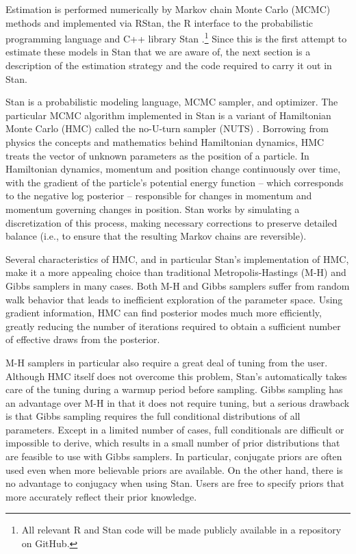 Estimation is performed numerically by Markov chain Monte Carlo (MCMC) methods and implemented via RStan, the R interface to the probabilistic programming language and C++ library Stan .\footnote{All relevant R and Stan code will be made publicly available in a repository on GitHub.} Since this is the first attempt to estimate these models in Stan that we are aware of, the next section is a description of the estimation strategy and the code required to carry it out in Stan.

Stan is a probabilistic modeling language, MCMC sampler, and optimizer. The particular MCMC algorithm implemented in Stan is a variant of Hamiltonian Monte Carlo (HMC) called the no-U-turn sampler (NUTS) . Borrowing from physics the concepts and mathematics behind Hamiltonian dynamics, HMC treats the vector of unknown parameters as the position of a particle. In Hamiltonian dynamics, momentum and position change continuously over time, with the gradient of the particle's potential energy function --  which corresponds to the negative log posterior -- responsible for changes in momentum and momentum governing changes in position. Stan works by simulating a discretization of this process, making necessary corrections to preserve detailed balance (i.e., to ensure that the resulting Markov chains are reversible). 

Several characteristics of HMC, and in particular Stan's implementation of HMC, make it a more appealing choice than traditional Metropolis-Hastings (M-H) and Gibbs samplers in many cases. Both M-H and Gibbs samplers suffer from random walk behavior that leads to inefficient exploration of the parameter space. Using gradient information, HMC can find posterior modes much more efficiently, greatly reducing the number of iterations required to obtain a sufficient number of effective draws from the posterior. 

M-H samplers in particular also require a great deal of tuning from the user. Although HMC itself does not overcome this problem, Stan's automatically takes care of the tuning during a warmup period before sampling. Gibbs sampling has an advantage over M-H in that it does not require tuning, but a serious drawback is that Gibbs sampling requires the full conditional distributions of all parameters. Except in a limited number of cases, full conditionals are difficult or impossible to derive, which results in a small number of prior distributions that are feasible to use with Gibbs samplers. In particular, conjugate priors are often used even when more believable priors are available. On the other hand, there is no advantage to conjugacy when using Stan. Users are free to specify priors that more accurately reflect their prior knowledge. 

